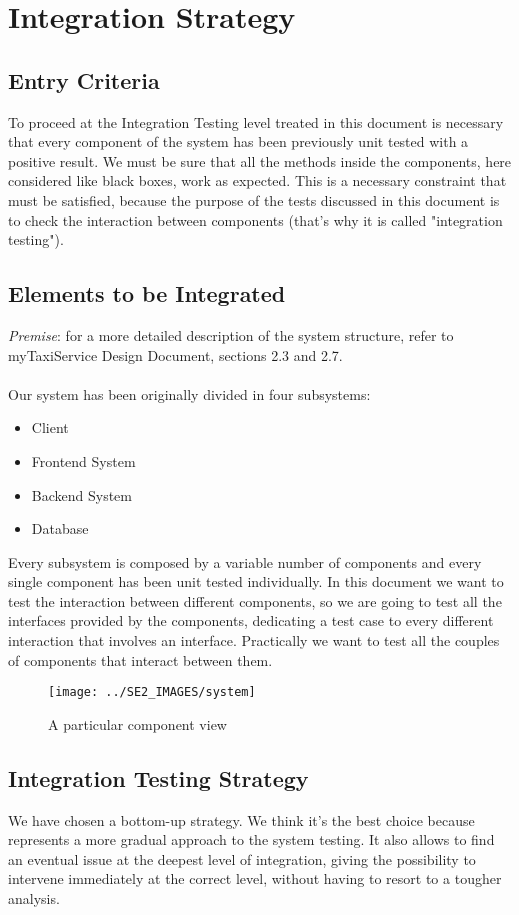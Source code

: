 \section{Integration Strategy}
	\subsection{Entry Criteria}
	To proceed at the Integration Testing level treated in this document is necessary that every
	component of the system has been previously unit tested with a positive result.
	We must be sure that all the methods inside the components, here considered like black boxes,
	work as expected.
	This is a necessary constraint that must be satisfied, because the purpose of the tests discussed in this
	document is to check the interaction between components (that's why it is called "integration testing").
	\subsection{Elements to be Integrated}
	\textit{Premise}: for a more detailed description of the system structure, refer to myTaxiService Design Document,
	sections 2.3 and 2.7.
	\\
	\\
	Our system has been originally divided in four subsystems:
	\begin{itemize}
		\item Client
		\item Frontend System
		\item Backend System
		\item Database
	\end{itemize}
	Every subsystem is composed by a variable number of components and every single component has been
	unit tested individually. In this document we want to test the interaction between different components,
	so we are going to test all the interfaces provided by the components, dedicating a test case to every
	different interaction that involves an interface. Practically we want to test all the couples of components
	that interact between them.
	\newpage
	\begin{figure}[h!]
		\begin{center}
			\texttt{[image: ../SE2\_IMAGES/system]}
			\caption{A particular component view}
		\end{center}
	\end{figure}
	\subsection{Integration Testing Strategy}
	We have chosen a bottom-up strategy. We think it's the best choice because represents a more gradual
	approach to the system testing. It also allows to find an eventual issue at the deepest level of
	integration, giving the possibility to intervene immediately at the correct level, without having to
	resort to a tougher analysis.
